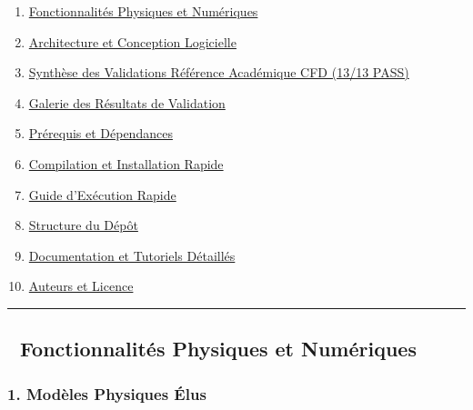 \documentclass[
  french,
]{article}
\providecommand{\tightlist}{%
  \setlength{\itemsep}{0pt}\setlength{\parskip}{0pt}}
\begin{document}
\begin{enumerate}
\def\labelenumi{\arabic{enumi}.}
\tightlist
\item
  \hyperref[-fonctionnalituxe9s-physiques-et-numuxe9riques]{Fonctionnalités
  Physiques et Numériques}
\item
  \hyperref[-architecture-et-conception-logicielle]{Architecture et
  Conception Logicielle}
\item
  \hyperref[-synthuxe8se-des-validations-Ruxe9fuxe9renceux5cux2520Acaduxe9mique-210-1313-pass]{Synthèse
  des Validations Référence Académique CFD (13/13 PASS)}
\item
  \hyperref[-galerie-des-ruxe9sultats-de-validation]{Galerie des
  Résultats de Validation}
\item
  \hyperref[-pruxe9requis-et-duxe9pendances]{Prérequis et Dépendances}
\item
  \hyperref[-compilation-et-installation-rapide]{Compilation et
  Installation Rapide}
\item
  \hyperref[-guide-dexuxe9cution-rapide]{Guide d'Exécution Rapide}
\item
  \hyperref[-structure-du-duxe9puxf4t]{Structure du Dépôt}
\item
  \hyperref[-documentation-et-tutoriels-duxe9tailluxe9s]{Documentation
  et Tutoriels Détaillés}
\item
  \hyperref[-auteurs-et-licence]{Auteurs et Licence}
\end{enumerate}

\begin{center}\rule{0.5\linewidth}{0.5pt}\end{center}

\subsection{🚀 Fonctionnalités Physiques et
Numériques}\label{fonctionnalituxe9s-physiques-et-numuxe9riques}

\subsubsection{1. Modèles Physiques
Élus}\label{moduxe8les-physiques-uxe9lus}
\end{document}
